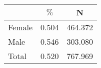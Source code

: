 \begin{tabular}{l*{2}{c}}
\hline\hline
            &        $\%$&           N\\
\hline
Female      &       0.504&     464.372\\
Male        &       0.546&     303.080\\
Total       &       0.520&     767.969\\
\hline\hline
\end{tabular}
